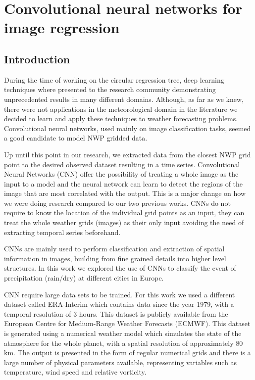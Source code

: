 

\section{Convolutional neural networks for image regression}

\subsection{Introduction}
During the time of working on the circular regression tree, deep learning techniques where presented to the research community demonstrating unprecedented results in many different domains. Although, as far as we knew, there were not applications in the meteorological domain in the literature we decided to learn and apply these techniques to weather forecasting problems. Convolutional neural networks, used mainly on image classification tasks, seemed a good candidate to model NWP gridded data.

\medskip

Up until this point in our research, we extracted data from the closest NWP grid point to the desired observed dataset resulting in a time series. Convolutional Neural Networks (CNN) offer the possibility of treating a whole image as the input to a model and the neural network can learn to detect the regions of the image that are most correlated with the output. This is a major change on how we were doing research compared to our two previous works. CNNs do not require to know the location of the individual grid points as an input, they can treat the whole weather grids (images) as their only input avoiding the need of extracting temporal series beforehand.

\medskip

CNNs are mainly used to perform classification and extraction of spatial information in images, building from fine grained details into higher level structures. In this work we explored the use of CNNs to classify the event of precipitation (rain/dry) at different cities in Europe. 

\medskip

CNN require large data sets to be trained. For this work we used a different dataset called ERA-Interim \citep{dee2011era} which contains data since the year 1979, with a temporal resolution of 3 hours. This dataset is publicly available from the European Centre for Medium-Range Weather Forecasts (ECMWF). This dataset is generated using a numerical weather model which simulates the state of the atmosphere for the whole planet, with a spatial resolution of approximately 80 km. The output is presented in the form of regular numerical grids and there is a large number of physical parameters available, representing variables such as temperature, wind speed and relative vorticity.

